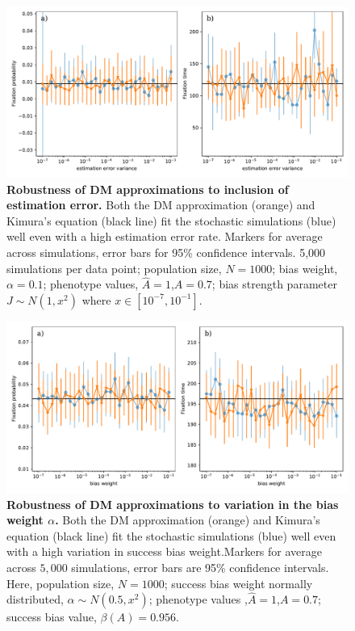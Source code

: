 \documentclass[12pt]{extarticle}
\begin{document}
\begin{figure}
    \includegraphics[width=\linewidth]{../figures/binary/full_vs_dm_mutation.pdf}
  \caption{
  \textbf{Robustness of DM approximations to inclusion of estimation error.} Both the DM approximation (orange) and Kimura's equation (black line) fit the stochastic simulations (blue) well even with a high estimation error rate. Markers for average across simulations, error bars for 95\% confidence intervals.
  5,000 simulations per data point; population size, $N=1000$; bias weight, $\alpha=0.1$; phenotype values, $\hat{A}=1$,$A=0.7$; bias strength parameter $J\sim N(1,x^2)$ where $x \in [10^{-7},10^{-1}]$.
  }	
  \label{fig:hetro_error}
\end{figure}


\begin{figure}
    \includegraphics[width=\linewidth]{../figures/binary/full_vs_dm_changing_alpha.pdf}
   \caption{\textbf{Robustness of DM approximations to variation in the bias weight $\alpha$.} 
   Both the DM approximation (orange) and Kimura's equation (black line) fit the stochastic simulations (blue) well even with a high variation in success bias weight.Markers for average across $5,000$ simulations, error bars are 95\% confidence intervals.
  Here, population size, $N=1000$; success bias weight normally distributed, $\alpha\sim N(0.5,x^2)$; phenotype values ,$\hat{A}=1$,$A=0.7$; success bias value, $\beta(A)=0.956$.}	
  \label{fig:hetro_alpha}
\end{figure}
\end{document}
